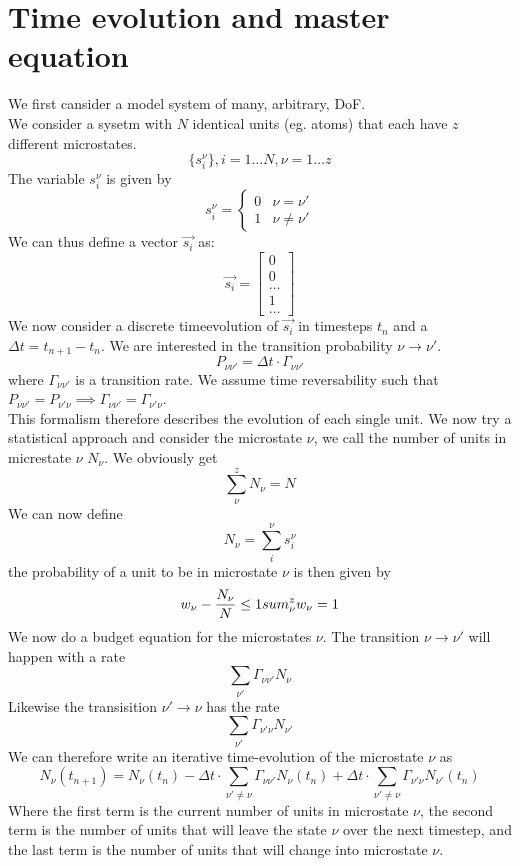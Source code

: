 \documentclass{report}
\begin{document}
\section{Time evolution and master equation}
We first cansider a model system of many, arbitrary, DoF.\\
We consider a sysetm with $N$ identical units (eg. atoms) that each have $z$ different microstates. \[
  \{s_i^\nu\} , i=1\ldots N, \nu=1\ldots z
\] The variable $s_i^\nu $ is given by \[
s_i^\nu = \begin{cases}
  0 & \nu = \nu' \\
  1 & \nu \neq \nu'
\end{cases}
\] We can thus define a vector $\vec{s_i}$ as: \[
\vec{s_i} = \begin{bmatrix} 0 \\ 0 \\ \ldots \\ 1 \\ \ldots \end{bmatrix} 
\] 
We now consider a discrete timeevolution of $\vec{s_i}$ in timesteps $t_n$ and a $\Delta t = t_{n+1} - t_n$. We are interested in the transition probability $\nu \to \nu'$. \[
  P_{\nu \nu'} = \Delta t  \cdot \Gamma_{\nu \nu'}
\] where $\Gamma_{\nu \nu'}$ is a transition rate. We assume time reversability such that $P_{\nu \nu'} = P_{\nu' \nu} \implies \Gamma_{\nu \nu'} = \Gamma_{\nu' \nu}$.\\
This formalism therefore describes the evolution of each single unit. We now try a statistical approach and consider the microstate $\nu$, we call the number of units in micrestate $\nu $ $N_\nu$. We obviously get \[
\sum_\nu^z N_\nu = N
\] We can now define \[
N_\nu = \sum_i^\nu s_i^\nu
\] the probability of a unit to be in microstate $\nu $ is then given by \[
w_\nu - \frac{N_\nu}{N} \le 1\\
sum_\nu^z w_\nu = 1
\] 
We now do a budget equation for the microstates $\nu $. The transition $\nu \to \nu'$ will happen with a rate \[
  \sum_{\nu'} \Gamma_{\nu\nu'} N_\nu
\] Likewise the transisition $\nu' \to \nu$ has the rate \[
\sum_{\nu'} \Gamma_{\nu'\nu} N_{\nu'}
\] 
We can therefore write an iterative time-evolution of the microstate $\nu$ as \[
  N_\nu\left( t_{n+1} \right) = N_\nu \left( t_n \right) - \Delta t \cdot \sum_{\nu' \neq \nu} \Gamma_{\nu \nu'} N_\nu \left( t_n \right) + \Delta t \cdot \sum_{\nu' \neq \nu} \Gamma_{\nu' \nu} N_{\nu'}\left( t_n \right) 
\] Where the first term is the current number of units in microstate $\nu$, the second term is the number of units that will leave the state $\nu$ over the next timestep, and the last term is the number of units that will change into microstate $\nu$.\\
\end{document}
